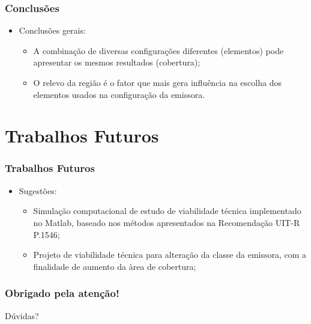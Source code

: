 \documentclass{beamer}
\begin{document}
    \begin{frame}
    \frametitle{Conclusões}
    
    \begin{itemize}
    
    \item Conclusões gerais:
    
      \begin{itemize}
    \item A combinação de diversas configurações diferentes (elementos) pode apresentar os mesmos resultados (cobertura);
    \item O relevo da região é o fator que mais gera influência na escolha dos elementos usados na configuração da emissora.
      \end{itemize}
    \end{itemize}
    \end{frame}

    \section{Trabalhos Futuros}
    \begin{frame}
    \frametitle{Trabalhos Futuros}
    
	    \begin{itemize}
     
	    \item Sugestões:

	    
	    \begin{itemize}
		  \item Simulação computacional de estudo de viabilidade técnica implementado no Matlab, baseado nos métodos apresentados na Recomendação UIT-R P.1546;

		  \item Projeto de viabilidade técnica para alteração da classe da emissora, com a finalidade de aumento da àrea de cobertura;

   
    \end{itemize}
    \end{itemize}
    \end{frame}

    \begin{frame}

      \frametitle{Obrigado pela atenção!}
      
      \begin{center}
      
    {\huge Dúvidas? } 

      \end{center} 
    
    \end{frame}

    
\end{document}
